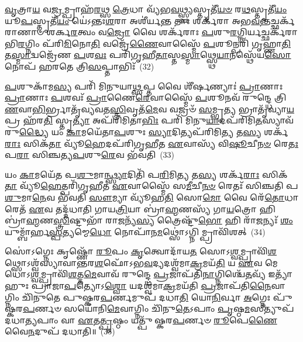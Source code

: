 \-\ul{𑌵𑍃}\-𑌤𑍍𑌰𑌾\-\ul{𑌯} 𑌵\-\ul{𑌜𑍍𑌰}\-𑌮𑍍𑌪𑍍𑌰𑌾𑌹᳴\-\ul{𑌰}\-𑌥𑍍𑌸 \ul{𑌤𑍍𑌰𑍇}\-𑌧𑌾 𑌵𑍍𑌯᳴𑌭\-\ul{𑌵}\-𑌥𑍍𑌸𑍍𑌫𑍍𑌯𑌸𑍍𑌤𑍃𑌤𑍀᳴\-\ul{𑌯}\-\-\ul{𑍞} 𑌰\-\ul{𑌥}\-𑌸𑍍𑌤𑍃𑌤𑍀᳴\-\ul{𑌯𑌂} 𑌯𑍂\-\ul{𑌪}\-𑌸𑍍𑌤𑍃𑌤𑍀᳴\-\ul{𑌯𑌂} 𑌯𑍇॑\-𑌽𑌨𑍍𑌤𑌃\-\ul{𑌶}\-𑌰𑌾 𑌅𑌶𑍀॑𑌰𑍍𑌯\-\ul{𑌨𑍍𑌤} 𑌤𑌾𑌃 𑌶𑌰𑍍𑌕᳴𑌰𑌾 𑌅𑌭\-\ul{𑌵}\-𑌨𑍍𑌤𑌚𑍍𑌛𑌰𑍍𑌕᳴𑌰𑌾𑌣𑌾𑍞 𑌶𑌰𑍍𑌕\-\ul{𑌰}\-𑌤𑍍𑌵𑌂 𑌵\-\ul{𑌜𑍍𑌰𑍋} 𑌵𑍈 𑌶𑌰𑍍𑌕᳴𑌰𑌾𑌃 \ul{𑌪}\-𑌶𑍁\-\ul{𑌰}\-𑌗𑍍𑌨𑌿𑌰𑍍𑌯𑌚𑍍𑌛𑌰𑍍𑌕᳴𑌰𑌾𑌭𑌿\-\ul{𑌰}\-𑌗𑍍𑌨𑌿𑌂 𑌪᳴𑌰𑌿\-\ul{𑌮𑌿}\-𑌨𑍋\-\ul{𑌤𑌿} 𑌵𑌜𑍍𑌰𑍇᳴\-\ul{𑌣𑍈}\-𑌵𑌾𑌸𑍍𑌮𑍈᳴ \ul{𑌪}\-𑌶𑍂𑌨𑍍𑌪𑌰𑌿᳴ 𑌗𑍃𑌹𑍍𑌣𑌾\-\ul{𑌤𑌿} 𑌤\-\ul{𑌸𑍍𑌮𑌾}\-𑌦𑍍𑌵𑌜𑍍𑌰𑍇᳴𑌣 \ul{𑌪}\-𑌶\-\ul{𑌵𑌃} 𑌪𑌰𑌿᳴𑌗𑍃𑌹𑍀\-\ul{𑌤𑌾}\-𑌸𑍍𑌤\-\ul{𑌸𑍍𑌮𑌾}\-𑌥𑍍𑌸𑍍𑌥𑍇\-\ul{𑌯𑌾}\-𑌨𑌸𑍍𑌥𑍇᳴𑌯\-\ul{𑌸𑍋} 𑌨𑍋𑌪᳴ 𑌹𑌰𑌤𑍇 𑌤𑍍𑌰𑌿\-\ul{𑌸}\-𑌪𑍍𑌤𑌾𑌭𑌿𑌃᳴~(32)

\-\ul{𑌪}\-𑌶𑍁𑌕𑌾᳴𑌮\-\ul{𑌸𑍍𑌯} 𑌪𑌰𑌿᳴ 𑌮𑌿𑌨𑍁𑌯𑌾\-\ul{𑌥𑍍𑌸}\-𑌪𑍍𑌤 𑌵𑍈 𑌶𑍀᳴𑌰𑍍\mbox{}\-\ul{𑌷}\-𑌣𑍍𑌯𑌾𑌃॑ \ul{𑌪𑍍𑌰𑌾}\-𑌣𑌾𑌃 \ul{𑌪𑍍𑌰𑌾}\-𑌣𑌾𑌃 \ul{𑌪}\-𑌶𑌵𑌃᳴ \ul{𑌪𑍍𑌰𑌾}\-𑌣𑍈\-\ul{𑌰𑍇}\-𑌵𑌾𑌸𑍍𑌮𑍈᳴ \ul{𑌪}\-𑌶𑍂𑌨𑌵᳴ 𑌰𑍁𑌨𑍍𑌦𑍍𑌧𑍇 𑌤𑍍𑌰𑌿\-\ul{𑌣}\-𑌵𑌾\-\ul{𑌭𑌿}\-\-𑌰𑍍𑌭𑍍𑌰𑌾𑌤𑍃᳴𑌵𑍍𑌯𑌵𑌤\-\ul{𑌸𑍍𑌤𑍍𑌰𑌿}\-𑌵𑍃𑌤᳴\-\ul{𑌮𑍇}\-𑌵 𑌵𑌜𑍍𑌰𑍞᳴ \ul{𑌸}\-𑌮𑍍𑌭𑍃\-\ul{𑌤𑍍𑌯} 𑌭𑍍𑌰𑌾𑌤𑍃᳴𑌵𑍍𑌯𑌾\-\ul{𑌯} 𑌪𑍍𑌰 𑌹᳴𑌰\-\ul{𑌤𑌿} 𑌸𑍍𑌤𑍃\-\ul{𑌤𑍍𑌯𑌾} 𑌅𑌪᳴𑌰𑌿𑌮𑌿𑌤𑌾\-\ul{𑌭𑌿𑌃} 𑌪𑌰𑌿᳴ 𑌮𑌿𑌨𑍁\-\ul{𑌯𑌾}\-𑌦𑌪᳴𑌰𑌿𑌮𑌿\-\ul{𑌤}\-𑌸𑍍𑌯𑌾𑌵᳴𑌰𑍁\-\ul{𑌦𑍍𑌧𑍍𑌯𑍈} 𑌯𑌂 \ul{𑌕𑌾}\-𑌮𑌯𑍇᳴𑌤𑌾\-\ul{𑌪}\-𑌶𑍁𑌃 \ul{𑌸𑍍𑌯𑌾}\-𑌦𑌿𑌤𑍍𑌯𑌪᳴𑌰𑌿𑌮𑌿\-\ul{𑌤𑍍𑌯} 𑌤\-\ul{𑌸𑍍𑌯} 𑌶𑌰𑍍𑌕᳴\-\ul{𑌰𑌾𑌃} 𑌸𑌿𑌕᳴\-\ul{𑌤𑌾} 𑌵𑍍𑌯𑍂᳴\-\ul{𑌹𑍇}\-𑌦𑌪᳴𑌰𑌿𑌗𑍃𑌹𑍀𑌤 \ul{𑌏}\-𑌵𑌾𑌸𑍍𑌯᳴ 𑌵𑌿\-\ul{𑌷𑍂}\-𑌚𑍀\-\ul{𑌨}\-\-\ul{𑍞} 𑌰𑍇\-\ul{𑌤𑌃} 𑌪\-\ul{𑌰𑌾} 𑌸𑌿𑌞𑍍𑌚𑌤𑍍𑌯\-\ul{𑌪}\-𑌶𑍁\-\ul{𑌰𑍇}\-𑌵 𑌭᳴𑌵𑌤𑌿~(33)

𑌯𑌂 \ul{𑌕𑌾}\-𑌮𑌯𑍇᳴𑌤 𑌪\-\ul{𑌶𑍁}\-𑌮𑌾\-\ul{𑌨𑍍𑌥𑍍𑌸𑍍𑌯𑌾}\-𑌦𑌿𑌤𑌿᳴ 𑌪\-\ul{𑌰𑌿}\-𑌮𑌿\-\ul{𑌤𑍍𑌯} 𑌤\-\ul{𑌸𑍍𑌯} 𑌶𑌰𑍍𑌕᳴\-\ul{𑌰𑌾𑌃} 𑌸𑌿𑌕᳴\-\ul{𑌤𑌾} 𑌵𑍍𑌯𑍂᳴\-\ul{𑌹𑍇}\-𑌤𑍍𑌪𑌰𑌿᳴𑌗𑍃𑌹𑍀𑌤 \ul{𑌏}\-𑌵𑌾𑌸𑍍𑌮𑍈᳴ 𑌸\-\ul{𑌮𑍀}\-𑌚𑍀\-\ul{𑌨}\-\-\ul{𑍞} 𑌰𑍇𑌤𑌃᳴ 𑌸𑌿𑌞𑍍𑌚𑌤𑌿 𑌪\-\ul{𑌶𑍁}\-𑌮𑌾\-\ul{𑌨𑍇}\-𑌵 𑌭᳴𑌵𑌤𑌿 \ul{𑌸𑍗}\-𑌮𑍍𑌯𑌾 𑌵𑍍𑌯𑍂᳴𑌹\-\ul{𑌤𑌿} 𑌸𑍋\-\ul{𑌮𑍋} 𑌵𑍈 𑌰𑍇᳴\-\ul{𑌤𑍋}\-𑌧𑌾 𑌰𑍇𑌤᳴ \ul{𑌏}\-𑌵 𑌤𑌦𑍍𑌦᳴𑌧𑌾𑌤𑌿 𑌗𑌾𑌯\-\ul{𑌤𑍍𑌰𑌿}\-𑌯𑌾 𑌬𑍍𑌰𑌾॑\-\ul{𑌹𑍍𑌮}\-𑌣𑌸𑍍𑌯᳴ 𑌗𑌾\-\ul{𑌯}\-𑌤𑍍𑌰𑍋 𑌹𑌿 𑌬𑍍𑌰𑌾॑\-\ul{𑌹𑍍𑌮}\-𑌣\-\ul{𑌸𑍍𑌤𑍍𑌰𑌿}\-𑌷𑍍𑌟𑍁𑌭𑌾᳴ 𑌰𑌾\-\ul{𑌜}\-𑌨𑍍𑌯᳴\-\ul{𑌸𑍍𑌯} 𑌤𑍍𑌰𑍈𑌷𑍍𑌟𑍁᳴\-\ul{𑌭𑍋} 𑌹𑌿 𑌰𑌾᳴\-\ul{𑌜}\-𑌨𑍍𑌯𑌃᳴ \ul{𑌶𑌂} 𑌯𑍁𑌮𑍍𑌬𑌾᳴𑌰𑍍\mbox{}𑌹\-\ul{𑌸𑍍𑌪}\-𑌤𑍍𑌯𑌮𑍍𑌮𑍇\-\ul{𑌧𑍋} 𑌨𑍋𑌪𑌾᳴𑌨\-\ul{𑌮}\-𑌥𑍍𑌸𑍋॑\-𑌽𑌗𑍍𑌨𑌿𑌮𑍍𑌪𑍍𑌰𑌾𑌵𑌿᳴𑌶𑌤𑍍~(34)

𑌸𑍋॑\-𑌽𑌗𑍍𑌨𑍇𑌃 𑌕𑍃𑌷𑍍𑌣𑍋᳴ \ul{𑌰𑍂}\-𑌪𑌂 \ul{𑌕𑍃}\-𑌤𑍍𑌵𑍋𑌦𑌾᳴𑌯\-\ul{𑌤} 𑌸𑍋\-𑌽\-\ul{𑌶𑍍𑌵}\-𑌮𑍍𑌪𑍍𑌰𑌾𑌵𑌿᳴\-\ul{𑌶}\-𑌥𑍍𑌸𑍋\-𑌽𑌶𑍍𑌵᳴𑌸𑍍𑌯𑌾𑌵𑌾𑌨𑍍𑌤𑌰\-\ul{𑌶}\-𑌫𑍋᳴\-𑌽𑌭\-\ul{𑌵}\-𑌦𑍍𑌯𑌦𑌶𑍍𑌵᳴𑌮𑌾\-\ul{𑌕𑍍𑌰}\-𑌮𑌯᳴\-\ul{𑌤𑌿} 𑌯 \ul{𑌏}\-𑌵 𑌮𑍇𑌧𑍋\-𑌽\-\ul{𑌶𑍍𑌵}\-𑌮𑍍𑌪𑍍𑌰𑌾𑌵𑌿᳴\-\ul{𑌶}\-𑌤𑍍𑌤\-\ul{𑌮𑍇}\-𑌵𑌾𑌵᳴ 𑌰𑍁𑌨𑍍𑌦𑍍𑌧𑍇 \ul{𑌪𑍍𑌰}\-𑌜𑌾𑌪᳴𑌤𑌿\-\ul{𑌨𑌾}\-𑌗𑍍𑌨𑌿𑌶𑍍𑌚𑍇᳴\-\ul{𑌤}\-𑌵𑍍𑌯᳴ 𑌇𑌤𑍍𑌯𑌾᳴𑌹𑍁𑌃 𑌪𑍍𑌰𑌾𑌜𑌾\-\ul{𑌪}\-𑌤𑍍𑌯𑍋\-𑌽\-\ul{𑌶𑍍𑌵𑍋} 𑌯𑌦𑌶𑍍𑌵᳴𑌮𑌾\-\ul{𑌕𑍍𑌰}\-𑌮𑌯᳴𑌤𑌿 \ul{𑌪𑍍𑌰}\-𑌜𑌾𑌪᳴𑌤𑌿\-\ul{𑌨𑍈}\-𑌵𑌾𑌗𑍍𑌨𑌿𑌂 𑌚𑌿᳴𑌨𑍁𑌤𑍇 𑌪𑍁𑌷𑍍𑌕𑌰\-\ul{𑌪}\-𑌰𑍍𑌣𑌮𑍁𑌪᳴ 𑌦𑌧𑌾\-\ul{𑌤𑌿} 𑌯𑍋\-\ul{𑌨𑌿}\-𑌰𑍍𑌵𑌾 \ul{𑌅}\-𑌗𑍍𑌨𑍇𑌃 𑌪𑍁᳴𑌷𑍍𑌕𑌰\-\ul{𑌪}\-𑌰𑍍𑌣𑍞 𑌸𑌯𑍋᳴𑌨𑌿\-\ul{𑌮𑍇}\-𑌵𑌾𑌗𑍍𑌨𑌿𑌂 𑌚𑌿᳴𑌨𑍁\-\ul{𑌤𑍇}\-\-𑌽𑌪𑌾𑌂 \ul{𑌪𑍃}\-𑌷𑍍𑌠\-\ul{𑌮}\-𑌸𑍀𑌤𑍍𑌯𑍁𑌪᳴ 𑌦𑌧𑌾\-\ul{𑌤𑍍𑌯}\-𑌪𑌾𑌂 𑌵𑌾 \ul{𑌏}\-𑌤\-\ul{𑌤𑍍𑌪𑍃}\-𑌷𑍍𑌠𑌂 𑌯𑌤𑍍𑌪𑍁᳴𑌷𑍍𑌕𑌰\-\ul{𑌪}\-𑌰𑍍𑌣𑍞 \ul{𑌰𑍂}\-𑌪𑍇\-\ul{𑌣𑍈}\-𑌵𑍈\-\ul{𑌨}\-𑌦𑍁𑌪᳴ 𑌦𑌧𑌾𑌤𑌿॥~(35)

